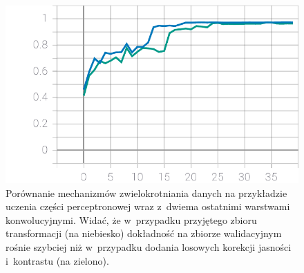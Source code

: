 \vspace{0.5cm}
\begin{figure}[h]
    \centering
    \includegraphics[scale=0.8]{img/eugmentation_test.pdf}
    \captionsetup{format=plain,justification=centering}
    \caption{\small Porównanie mechanizmów zwielokrotniania danych na przykładzie uczenia części perceptronowej wraz z~dwiema ostatnimi warstwami konwolucyjnymi. Widać, że w~przypadku przyjętego zbioru transformacji (na niebiesko) dokładność na zbiorze walidacyjnym rośnie szybciej niż w~przypadku dodania losowych korekcji jasności i~kontrastu (na zielono).}
    \label{augmentation_test_img}
\end{figure}
\vspace{0.5cm}



